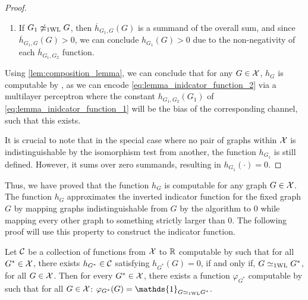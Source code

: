 \begin{proof}
\begin{enumerate}
        \item If $G_1 \not\simeq_{\text{1WL}} G$, then $\overline{h}_{G_1, G}(G)$ is a summand of the overall sum, and since $\overline{h}_{G_1, G}(G) > 0$, 
        we can conclude $h_{G_1}(G) > 0$ due to the non-negativity of each $\overline{h}_{G_1, G_2}$ function.
    \end{enumerate}
    Using \cref{lem:composition_lemma}, we can conclude that for any $G \in \mathcal{X}$, $h_G$ is computable by \wlnn, as we can encode \cref{eq:lemma_inidcator_function_2} via a multilayer perceptron where the constant $h_{G_1, G_2}(G_1)$ of \cref{eq:lemma_inidcator_function_1} will be the bias of the corresponding channel, such that this \mlp exists.

    It is crucial to note that in the special case where no pair of graphs within $\mathcal{X}$ is indistinguishable by the \wl isomorphism test from another, the function $h_{G_1}$ is still defined. However, it sums over zero summands, resulting in $h_{G_1}(\cdot) = 0$.
\end{proof}

Thus, we have proved that the function $h_{G}$ is \wlnn computable for any graph $G \in \mathcal{X}$. The function $h_{G}$ approximates the inverted indicator function for the fixed graph $G$ by mapping graphs indistinguishable from $G$ by the \wl algorithm to $0$ while mapping every other graph to something strictly larger than $0$. The following proof will use this property to construct the indicator function.

\begin{lemma}\label{lem:encoding-indicator-func2}
    Let $\mathcal{C}$ be a collection of functions from $\mathcal{X}$ to $\mathbb{R}$ computable by \wlnn such that for all $G^* \in \mathcal{X}$, there exists $h_{G^*} \in \mathcal{C}$ satisfying $h_{G^*}(G) = 0 $, if and only if, $G \simeq_{\text{1WL}} G^*$, for all $G \in \mathcal{X}$. Then for every $G^* \in \mathcal{X}$, there exists a function $\varphi_{G^*} $ computable by \wlnn such that for all $G \in \mathcal{X}$: $\varphi_{G^*}(G) = \mathds{1}_{G \wliso G^*}$.
\end{lemma}

